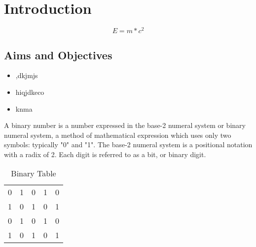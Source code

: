 \section{Introduction}
\lipsum[1-5]
\begin{equation} \label{eqRelativity} E=m*c^2 \end{equation}

\subsection{Aims and Objectives}
\begin{itemize}
    \item ,dkjmjs
    \item hiqjdkeco
    \item knma
\end{itemize}
A binary number is a number expressed in the base-2 numeral system or binary numeral system, a method of mathematical expression which uses only two symbols: typically "0" and "1". The base-2 numeral system is a positional notation with a radix of 2. Each digit is referred to as a bit, or binary digit.



\begin{table}[h!]
\begin{center}
\caption{Binary Table}
\begin{tabular}{|l|l|l|l|l|}
\hline
0 & 1 & 0 & 1 & 0 \\ 
1 & 0 & 1 & 0 & 1 \\
0 & 1 & 0 & 1 & 0 \\
1 & 0 & 1 & 0 & 1 \\
\hline
\end{tabular}
\end{center}
\end{table}
\lipsum[6-10]
